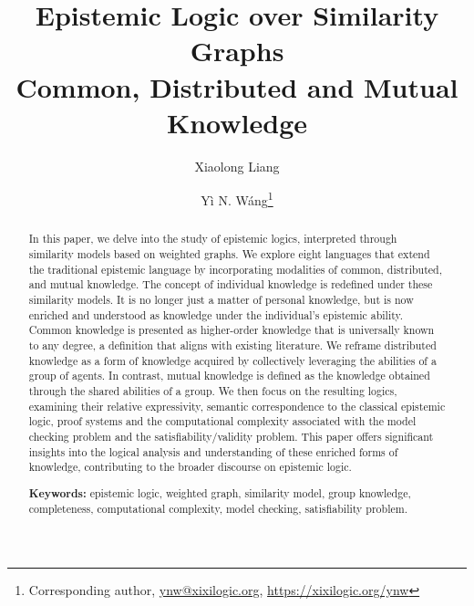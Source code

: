 \documentclass{article}
\newenvironment{keywords}
{\par\noindent\textbf{Keywords:}}{\par}
\begin{document}
\title{Epistemic Logic over Similarity Graphs \\{\large Common, Distributed and Mutual Knowledge}}

\date{}

\author[1]{Xiaolong Liang}
\author[2]{Y\`{i} N. W\'{a}ng\footnote{Corresponding author, \href{mailto:ynw@xixilogic.org}{ynw@xixilogic.org}, \href{https://xixilogic.org/ynw}{https://xixilogic.org/ynw}}}

\maketitle

\begin{abstract}
In this paper, we delve into the study of epistemic logics, interpreted through similarity models based on weighted graphs. We explore eight languages that extend the traditional epistemic language by incorporating modalities of common, distributed, and mutual knowledge.
%
The concept of individual knowledge is redefined under these similarity models. It is no longer just a matter of personal knowledge, but is now enriched and understood as knowledge under the individual's epistemic ability. Common knowledge is presented as higher-order knowledge that is universally known to any degree, a definition that aligns with existing literature. We reframe distributed knowledge as a form of knowledge acquired by collectively leveraging the abilities of a group of agents. In contrast, mutual knowledge is defined as the knowledge obtained through the shared abilities of a group.
%
We then focus on the resulting logics, examining their relative expressivity, semantic correspondence to the classical epistemic logic, proof systems and the computational complexity associated with the model checking problem and the satisfiability/validity problem. This paper offers significant insights into the logical analysis and understanding of these enriched forms of knowledge, contributing to the broader discourse on epistemic logic.\vspace{0.5em}
%
\begin{keywords}
epistemic logic, weighted graph, similarity model, group knowledge, completeness, computational complexity, model checking, satisfiability problem.
\end{keywords}
\end{abstract}
\end{document}

